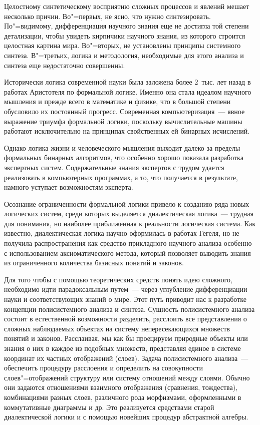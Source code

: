\documentclass[14pt,draft,openany]{extbook}
\begin{document}
Целостному синтетическому восприятию сложных процессов и явлений мешает несколько причин. Во"=первых, не ясно, что нужно синтезировать. По"=видимому, дифференциация научного знания еще не достигла той степени детализации, чтобы увидеть кирпичики научного знания, из которого строится целостная картина мира. Во"=вторых, не установлены принципы системного синтеза. В"=третьих, логика и методология, необходимые для этого анализа и синтеза еще недостаточно совершенны.

Исторически логика современной науки была заложена более 2~тыс. лет назад в работах Аристотеля по формальной логике. Именно она стала идеалом научного мышления и прежде всего в математике и физике, что в большой степени обусловило их постоянный прогресс. Современная компьютеризация~--- явное выражение триумфа формальной логики, поскольку вычислительные машины работают исключительно на принципах свойственных ей бинарных исчислений.

Однако логика жизни и человеческого мышления выходит далеко за пределы формальных бинарных алгоритмов, что особенно хорошо показала разработка экспертных систем. Содержательные знания экспертов с трудом удается реализовать в компьютерных программах, а то, что получается в результате, намного уступает возможностям эксперта.

Осознание ограниченности формальной логики привело к созданию ряда новых логических систем, среди которых выделяется диалектическая логика~--- трудная для понимания, но наиболее приближенная к реальности логическая система. Как известно, диалектическая логика научно оформилась в работах Гегеля, но не получила распространения как средство прикладного научного анализа особенно с использованием аксиоматического метода, который позволяет выводить знания из ограниченного количества базисных понятий и законов.

Для того чтобы с помощью теоретических средств понять идею сложного, необходимо идти парадоксальным путем~--- через углубление дифференциации науки и соответствующих знаний о мире.  Этот путь приводит нас к разработке концепции полисистемного анализа и синтеза. Сущность полисистемного анализа состоит в естественной возможности разделить, расслоить все представления о сложных наблюдаемых объектах на систему непересекающихся множеств понятий и законов. Расслаивая, мы как бы проецируем природные объекты или знания о них в каждое из подобных множеств, представляя единое в системе координат их частных отображений (слоев). Задача полисистемного анализа~--- обеспечить процедуру расслоения и определить на совокупности слоев"=отображений структуру или систему отношений между слоями. Обычно они задаются отношениями взаимного отображения (сравнения, тождества), комбинациями разных слоев, различного рода морфизмами, оформленными в коммутативные диаграммы и др. Это реализуется средствами старой диалектической логики и с помощью новейших процедур абстрактной алгебры.
\end{document}
